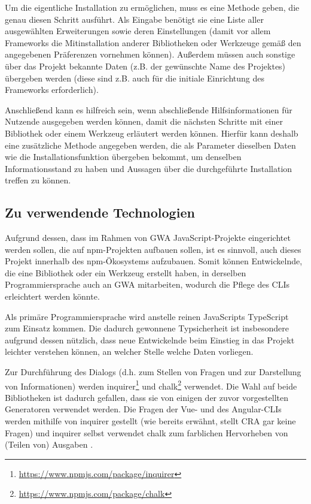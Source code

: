 Um die eigentliche Installation zu ermöglichen, muss es eine Methode geben, die genau diesen Schritt ausführt. Als Eingabe benötigt sie eine Liste aller ausgewählten Erweiterungen sowie deren Einstellungen (damit vor allem Frameworks die Mitinstallation anderer Bibliotheken oder Werkzeuge gemäß den angegebenen Präferenzen vornehmen können). Außerdem müssen auch sonstige über das Projekt bekannte Daten (z.B. der gewünschte Name des Projektes) übergeben werden (diese sind z.B. auch für die initiale Einrichtung des Frameworks erforderlich).

Anschließend kann es hilfreich sein, wenn abschließende Hilfsinformationen für Nutzende ausgegeben werden können, damit die nächsten Schritte mit einer Bibliothek oder einem Werkzeug erläutert werden können. Hierfür kann deshalb eine zusätzliche Methode angegeben werden, die als Parameter dieselben Daten wie die Installationsfunktion übergeben bekommt, um denselben Informationsstand zu haben und Aussagen über die durchgeführte Installation treffen zu können.

\subsection{Zu verwendende Technologien}
Aufgrund dessen, dass im Rahmen von \gls{GWA} JavaScript-Projekte eingerichtet werden sollen, die auf \gls{npm}-Projekten aufbauen sollen, ist es sinnvoll, auch dieses Projekt innerhalb des \gls{npm}-Ökosystems aufzubauen. Somit können Entwickelnde, die eine Bibliothek oder ein Werkzeug erstellt haben, in derselben Programmiersprache auch an \gls{GWA} mitarbeiten, wodurch die Pflege des \gls{CLI}s erleichtert werden könnte.

Als primäre Programmiersprache wird anstelle reinen JavaScripts TypeScript zum Einsatz kommen. Die dadurch gewonnene Typsicherheit ist insbesondere aufgrund dessen nützlich, dass neue Entwickelnde beim Einstieg in das Projekt leichter verstehen können, an welcher Stelle welche Daten vorliegen.

Zur Durchführung des Dialogs (d.h. zum Stellen von Fragen und zur Darstellung von Informationen) werden inquirer\footnote{\url{https://www.npmjs.com/package/inquirer}} und chalk\footnote{\url{https://www.npmjs.com/package/chalk}} verwendet. Die Wahl auf beide Bibliotheken ist dadurch gefallen, dass sie von einigen der zuvor vorgestellten Generatoren verwendet werden. Die Fragen der Vue- und des Angular-\gls{CLI}s werden mithilfe von inquirer gestellt \cite{vue_cli_uses_inquirer} \cite{angular_cli_uses_inquirer} (wie bereits erwähnt, stellt \gls{CRA} gar keine Fragen) und inquirer selbst verwendet chalk zum farblichen Hervorheben von (Teilen von) Ausgaben \cite{inquirer_uses_chalk}.

